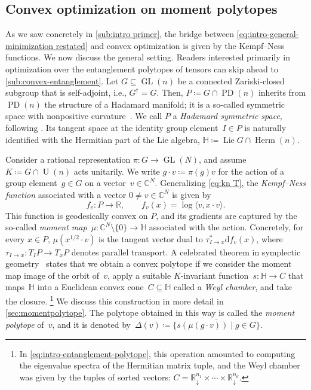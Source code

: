 \documentclass[11pt,letterpaper]{article}
\numberwithin{equation}{section}
\newcommand{\RR}{\mathbb{R}}
\newcommand{\CC}{\mathbb{C}}
\newcommand{\bbH}{\mathbb{H}}
\newcommand{\diff}{\mathrm{d}}
\DeclareMathOperator{\PD}{PD}
\DeclareMathOperator{\U}{U}
\DeclareMathOperator{\GL}{GL}
\DeclareMathOperator{\Lie}{Lie}
\DeclareMathOperator{\Herm}{Herm}
\begin{document}
\subsection{Convex optimization on moment polytopes}\label{sub:convex-moment}
As we saw concretely in \cref{sub:intro primer}, the bridge between \cref{eq:intro-general-minimization restated} and convex optimization is given by the Kempf--Ness functions.
We now discuss the general setting.
Readers interested primarily in optimization over the entanglement polytopes of tensors can skip ahead to \cref{sub:convex-entanglement}.
Let $G\subseteq \GL(n)$ be a connected Zariski-closed subgroup that is self-adjoint, i.e., $G^\dag=G$.
Then, $P\coloneqq G\cap \PD(n)$ inherits from $\PD(n)$ the structure of a Hadamard manifold; it is a so-called symmetric space with nonpositive curvature~\cite{Helgason1978,Hirai2024}.
We call $P$ a \emph{Hadamard symmetric space}, following \cite{HNW2023}.
Its tangent space at the identity group element~$I \in P$ is naturally identified with the Hermitian part of the Lie algebra, $\bbH \coloneqq \Lie G \cap \Herm(n)$.


Consider a rational representation $\pi \colon G\rightarrow\GL(N)$, and assume $K \coloneqq G \cap \U(n)$ acts unitarily.
We write $g \cdot v \coloneqq \pi(g)v$ for the action of a group element~$g \in G$ on a vector~$v \in \CC^N$.
Generalizing \cref{eq:kn T}, the \emph{Kempf--Ness function} associated with a vector $0\neq v\in\CC^N$ is given by
\[
    f_v \colon P \to \RR,\qquad f_v(x) = \log\langle v,x\cdot v\rangle.
\]
This function is geodesically convex on $P$, and its gradients are captured by the so-called \emph{moment map}~$\mu \colon \CC^N\setminus\{0\} \to \bbH$ associated with the action.
Concretely, for every $x\in P$, $\mu(x^{1/2} \cdot v)$ is the tangent vector dual to $\tau^\ast_{I\rightarrow x}\diff f_v(x)$, where $\tau_{I\rightarrow x} \colon T_I P \to T_x P$ denotes parallel transport.
A celebrated theorem in symplectic geometry~\cite{Kirwan1984,NessMumford1984} states that we obtain a convex polytope if we consider the moment map image of the orbit of~$v$, apply a suitable $K$-invariant function~$s \colon \bbH \to C$ that maps~$\bbH$ into a Euclidean convex cone~$C \subseteq \bbH$ called a \emph{Weyl chamber}, and take the closure.%
\footnote{In \cref{eq:intro-entanglement-polytope}, this operation amounted to computing the eigenvalue spectra of the Hermitian matrix tuple, and the Weyl chamber was given by the tuples of sorted vectors: $C = \RR^{n_1}_\downarrow \times \cdots \times \RR^{n_d}_\downarrow$.}
We discuss this construction in more detail in \cref{sec:momentpolytope}.
The polytope obtained in this way is called the \emph{moment polytope} of~$v$, and it is denoted by~$\Delta(v) \coloneqq \overline{\{ s(\mu(g \cdot v)) \mid g \in G \}}$.
\end{document}
